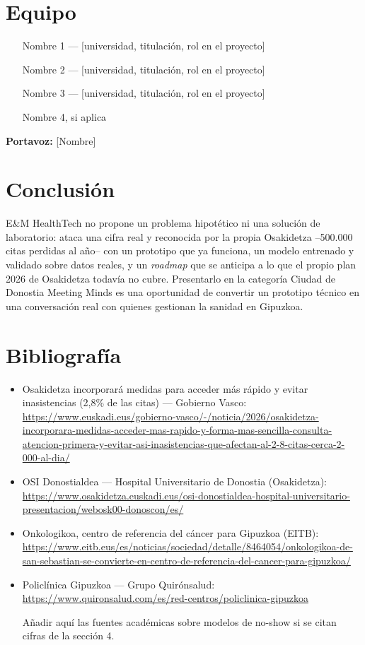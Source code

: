 \documentclass[11pt,a4paper]{article}
\begin{document}
\section{Equipo}

\begin{itemize}
  \item [Nombre 1] --- [universidad, titulación, rol en el proyecto]
  \item [Nombre 2] --- [universidad, titulación, rol en el proyecto]
  \item [Nombre 3] --- [universidad, titulación, rol en el proyecto]
  \item [Nombre 4, si aplica]
\end{itemize}

\textbf{Portavoz:} [Nombre]

\section{Conclusión}

E\&M HealthTech no propone un problema hipotético ni una solución de laboratorio: ataca una cifra real y reconocida por la propia Osakidetza --500.000 citas perdidas al año-- con un prototipo que ya funciona, un modelo entrenado y validado sobre datos reales, y un \textit{roadmap} que se anticipa a lo que el propio plan 2026 de Osakidetza todavía no cubre. Presentarlo en la categoría Ciudad de Donostia Meeting Minds es una oportunidad de convertir un prototipo técnico en una conversación real con quienes gestionan la sanidad en Gipuzkoa.

\section*{Bibliografía}
\begin{itemize}
  \item Osakidetza incorporará medidas para acceder más rápido y evitar inasistencias (2,8\% de las citas) --- Gobierno Vasco: \url{https://www.euskadi.eus/gobierno-vasco/-/noticia/2026/osakidetza-incorporara-medidas-acceder-mas-rapido-y-forma-mas-sencilla-consulta-atencion-primera-y-evitar-asi-inasistencias-que-afectan-al-2-8-citas-cerca-2-000-al-dia/}
  \item OSI Donostialdea --- Hospital Universitario de Donostia (Osakidetza): \url{https://www.osakidetza.euskadi.eus/osi-donostialdea-hospital-universitario-presentacion/webosk00-donoscon/es/}
  \item Onkologikoa, centro de referencia del cáncer para Gipuzkoa (EITB): \url{https://www.eitb.eus/es/noticias/sociedad/detalle/8464054/onkologikoa-de-san-sebastian-se-convierte-en-centro-de-referencia-del-cancer-para-gipuzkoa/}
  \item Policlínica Gipuzkoa --- Grupo Quirónsalud: \url{https://www.quironsalud.com/es/red-centros/policlinica-gipuzkoa}
  \item [Añadir aquí las fuentes académicas sobre modelos de no-show si se citan cifras de la sección 4.]
\end{itemize}
\end{document}
